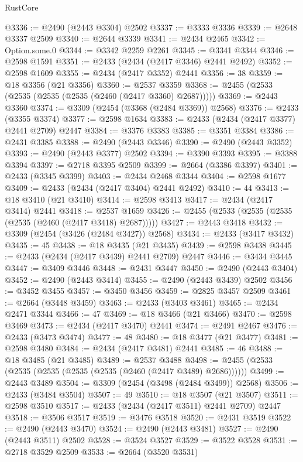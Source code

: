 \begin{lexlean}{RustCore}
\begin{coremodule}
@3336 := @2490 (@2443 @3304) @2502
@3337 := @3333 @3336
@3339 := @2648 @3337 @2509
@3340 := @2644 @3339
@3341 := @2434 @2465
@3342 := Option.some.{0}
@3344 := @3342 @2259 @2261
@3345 := @3341 @3344
@3346 := @2598 @1591
@3351 := @2433 (@2434 (@2417 @3346) @2441 @2492)
@3352 := @2598 @1609
@3355 := @2434 (@2417 @3352) @2441
@3356 := 38
@3359 := @18 @3356 (@21 @3356)
@3360 := @2537 @3359
@3368 := @2455 (@2533 (@2535 (@2535 (@2535 (@2460 (@2417 @3360) @2687)))))
@3369 := @2443 @3360
@3374 := @3309 (@2454 (@3368 (@2484 @3369)) @2568)
@3376 := @2433 (@3355 @3374)
@3377 := @2598 @1634
@3383 := @2433 (@2434 (@2417 @3377) @2441 @2709) @2447
@3384 := @3376 @3383
@3385 := @3351 @3384
@3386 := @2431 @3385
@3388 := @2490 (@2443 @3346)
@3390 := @2490 (@2443 @3352)
@3393 := @2490 (@2443 @3377) @2502
@3394 := @3390 @3393
@3395 := @3388 @3394
@3397 := @2718 @3395 @2509
@3399 := @2664 (@3386 @3397)
@3401 := @2433 (@3345 @3399)
@3403 := @2434 @2468 @3344
@3404 := @2598 @1677
@3409 := @2433 (@2434 (@2417 @3404) @2441 @2492)
@3410 := 44
@3413 := @18 @3410 (@21 @3410)
@3414 := @2598 @3413
@3417 := @2434 (@2417 @3414) @2441
@3418 := @2537 @1659
@3426 := @2455 (@2533 (@2535 (@2535 (@2535 (@2460 (@2417 @3418) @2687)))))
@3427 := @2443 @3418
@3432 := @3309 (@2454 (@3426 (@2484 @3427)) @2568)
@3434 := @2433 (@3417 @3432)
@3435 := 45
@3438 := @18 @3435 (@21 @3435)
@3439 := @2598 @3438
@3445 := @2433 (@2434 (@2417 @3439) @2441 @2709) @2447
@3446 := @3434 @3445
@3447 := @3409 @3446
@3448 := @2431 @3447
@3450 := @2490 (@2443 @3404)
@3452 := @2490 (@2443 @3414)
@3455 := @2490 (@2443 @3439) @2502
@3456 := @3452 @3455
@3457 := @3450 @3456
@3459 := @2825 @3457 @2509
@3461 := @2664 (@3448 @3459)
@3463 := @2433 (@3403 @3461)
@3465 := @2434 @2471 @3344
@3466 := 47
@3469 := @18 @3466 (@21 @3466)
@3470 := @2598 @3469
@3473 := @2434 (@2417 @3470) @2441
@3474 := @2491 @2467
@3476 := @2433 (@3473 @3474)
@3477 := 48
@3480 := @18 @3477 (@21 @3477)
@3481 := @2598 @3480
@3484 := @2434 (@2417 @3481) @2441
@3485 := 46
@3488 := @18 @3485 (@21 @3485)
@3489 := @2537 @3488
@3498 := @2455 (@2533 (@2535 (@2535 (@2535 (@2535 (@2460 (@2417 @3489) @2686))))))
@3499 := @2443 @3489
@3504 := @3309 (@2454 (@3498 (@2484 @3499)) @2568)
@3506 := @2433 (@3484 @3504)
@3507 := 49
@3510 := @18 @3507 (@21 @3507)
@3511 := @2598 @3510
@3517 := @2433 (@2434 (@2417 @3511) @2441 @2709) @2447
@3518 := @3506 @3517
@3519 := @3476 @3518
@3520 := @2431 @3519
@3522 := @2490 (@2443 @3470)
@3524 := @2490 (@2443 @3481)
@3527 := @2490 (@2443 @3511) @2502
@3528 := @3524 @3527
@3529 := @3522 @3528
@3531 := @2718 @3529 @2509
@3533 := @2664 (@3520 @3531)

\end{coremodule}
\end{lexlean}
